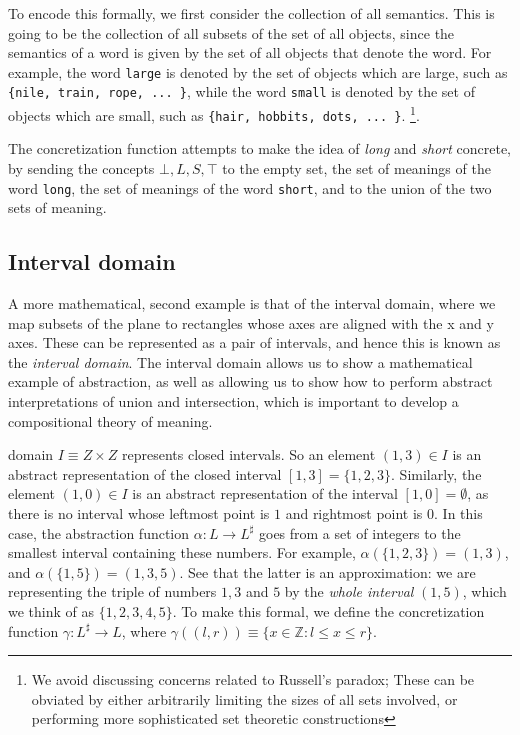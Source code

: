 \documentclass[11pt]{book}
\begin{document}
To encode this formally, we first consider the collection of all semantics.
This is going to be the collection of all subsets of the set of all objects,
since the semantics of a word is given by the set of all  objects that denote the word.
For example, the word \texttt{large} is denoted by the set of objects which are large,
such as \texttt{\{nile, train, rope, ... \}},
while the word \texttt{small} is denoted by the set of objects which are small,
such as \texttt{\{hair, hobbits, dots, ... \}}.
\footnote{We avoid discussing concerns related 
to Russell's paradox; These can be obviated by either arbitrarily limiting the sizes of all sets
involved, or performing more sophisticated set theoretic constructions}.

The concretization function attempts to make the idea of \emph{long} and
\emph{short} concrete, by sending the concepts $\bot, L, S, \top$ to the empty
set, the set of meanings of the word \texttt{long}, the set of meanings of the word 
\texttt{short}, and to the union of the two sets of meaning.

\subsection{Interval domain}

A more mathematical, second example is that of the interval domain, where we map
subsets of the plane to rectangles whose axes are aligned with the x and y axes.
These can be represented as a pair of intervals, and hence this is known as the
\emph{interval domain}. The interval domain allows us to show a mathematical example
of abstraction, as well as allowing us to show how to perform abstract interpretations
of union and intersection, which is important to develop a compositional theory of meaning.

domain $I \equiv Z \times Z$ represents closed intervals. So an element $(1, 3)
\in I$ is an abstract representation of the closed interval $[1, 3] = \{ 1, 2,
3 \}$.  Similarly, the element $(1, 0) \in I$ is an abstract representation of
the interval $[1, 0] = \emptyset$, as there is no interval whose leftmost point
is $1$ and rightmost point is $0$.  In this case, the abstraction function
$\alpha: L \rightarrow L^\sharp$ goes from a set of integers to the smallest
interval containing these numbers. For example, $\alpha(\{1, 2, 3\}) = (1, 3)$,
and $\alpha(\{1, 5\}) = (1, 3, 5)$.  See that the latter is an approximation:
we are representing the triple of numbers $1, 3$ and $5$ by the \emph{whole
interval} $(1, 5)$, which we think of as $\{1, 2, 3, 4, 5\}$. To make this
formal, we define the concretization function $\gamma: L^\sharp \rightarrow L$,
where $\gamma((l, r)) \equiv \{ x \in \mathbb Z : l \leq x \leq r \}$.
\end{document}
